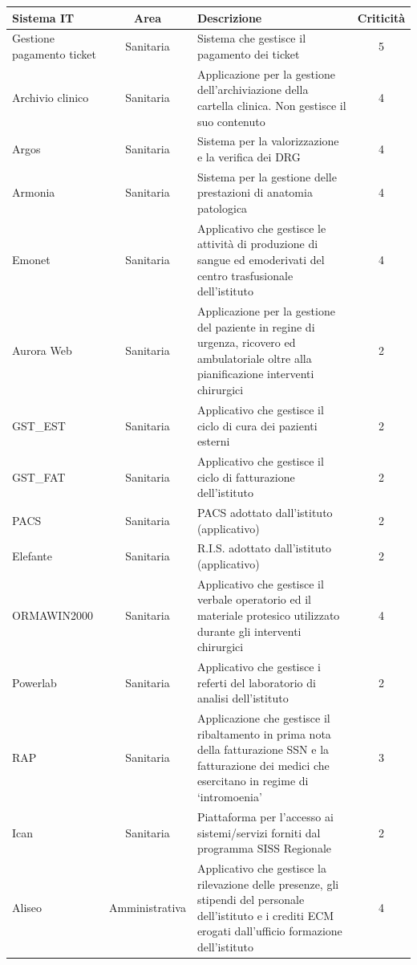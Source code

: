 \documentclass[12pt, a4paper, titlepage]{report}
\begin{document}
		\begin{longtable}{| p{4cm} | c | p{6cm} | c |}
				\hline
				\textbf{Sistema IT} & \textbf{Area} & \textbf{Descrizione} & \textbf{Criticità} \\ \hline
				Gestione pagamento ticket & Sanitaria & Sistema che gestisce il pagamento dei ticket & 5 \\ \hline
				Archivio clinico & Sanitaria & Applicazione per la gestione dell'archiviazione della cartella clinica. Non gestisce il suo contenuto & 4 \\ \hline
				Argos & Sanitaria & Sistema per la valorizzazione e la verifica dei DRG & 4 \\ \hline
				Armonia & Sanitaria & Sistema per la gestione delle prestazioni di anatomia patologica & 4 \\ \hline
				Emonet & Sanitaria & Applicativo che gestisce le attività di produzione di sangue ed emoderivati del centro trasfusionale dell'istituto & 4 \\ \hline
				Aurora Web & Sanitaria & Applicazione per la gestione del paziente in regine di urgenza, ricovero ed ambulatoriale oltre alla pianificazione interventi chirurgici & 2 \\ \hline
				GST\_EST & Sanitaria & Applicativo che gestisce il ciclo di cura dei pazienti esterni & 2 \\ \hline
				GST\_FAT & Sanitaria & Applicativo che gestisce il ciclo di fatturazione dell'istituto & 2 \\ \hline
				PACS & Sanitaria & PACS adottato dall'istituto (applicativo) & 2 \\ \hline
				Elefante & Sanitaria & R.I.S. adottato dall'istituto (applicativo) & 2 \\ \hline
				ORMAWIN2000 & Sanitaria & Applicativo che gestisce il verbale operatorio ed il materiale protesico utilizzato durante gli interventi chirurgici & 4 \\ \hline
				Powerlab & Sanitaria & Applicativo che gestisce i referti del laboratorio di analisi dell'istituto & 2 \\ \hline
				RAP & Sanitaria & Applicazione che gestisce il ribaltamento in prima nota della fatturazione SSN e la fatturazione dei medici che esercitano in regime di `intromoenia' & 3 \\ \hline
				Ican & Sanitaria & Piattaforma per l'accesso ai sistemi/servizi forniti dal programma SISS Regionale & 2 \\ \hline
				Aliseo & Amministrativa & Applicativo che gestisce la rilevazione delle presenze, gli stipendi del personale dell'istituto e i crediti ECM erogati dall'ufficio formazione dell'istituto & 4 \\ \hline

\end{longtable}
\end{document}
